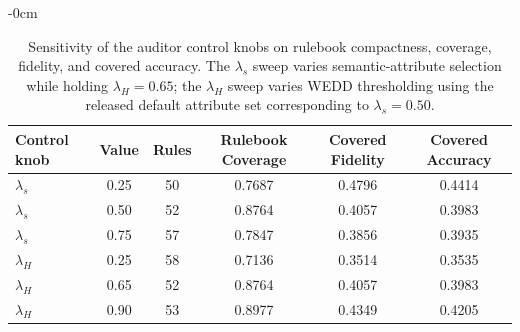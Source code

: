 \begin{table}[H]
\caption{Sensitivity of the auditor control knobs on rulebook compactness, coverage, fidelity, and covered accuracy. The $\lambda_s$ sweep varies semantic-attribute selection while holding $\lambda_H=0.65$; the $\lambda_H$ sweep varies WEDD thresholding using the released default attribute set corresponding to $\lambda_s=0.50$.\label{tab:control_knob_sensitivity}}
\begin{adjustwidth}{-\extralength}{0cm}
\centering
\small
\begin{tabular}{lccccc}
\toprule
Control knob & Value & Rules & Rulebook Coverage & Covered Fidelity & Covered Accuracy \\
\midrule
$\lambda_s$ & 0.25 & 50 & 0.7687 & 0.4796 & 0.4414 \\
$\lambda_s$ & 0.50 & 52 & 0.8764 & 0.4057 & 0.3983 \\
$\lambda_s$ & 0.75 & 57 & 0.7847 & 0.3856 & 0.3935 \\
$\lambda_H$ & 0.25 & 58 & 0.7136 & 0.3514 & 0.3535 \\
$\lambda_H$ & 0.65 & 52 & 0.8764 & 0.4057 & 0.3983 \\
$\lambda_H$ & 0.90 & 53 & 0.8977 & 0.4349 & 0.4205 \\
\bottomrule
\end{tabular}
\end{adjustwidth}
\end{table}
